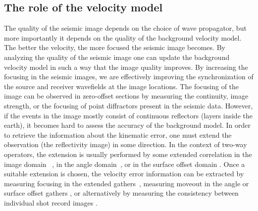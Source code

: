 \subsection{The role of the velocity model}
The quality of the seismic image depends on the choice of wave propagator, but more importantly
 it depends on the quality of the background velocity model. The better the velocity, the more
 focused the seismic image becomes. By analyzing the quality of the 
seismic image one can update the background velocity model in such a way that the image quality improves. 
 By increasing the focusing in the seismic images, we are effectively improving the synchronization
of the source and receiver wavefields at the image locations. 
 The focusing of the image can be observed in zero-offset sections by measuring the 
continuity, image strength, or the focusing of point diffractors present in the seismic data. 
 However, if the events in the image mostly consist of continuous reflectors (layers inside the earth),
it becomes hard to assess the accuracy of the background model. 
 In order to retrieve the information about the kinematic error, one must extend the 
observation (the reflectivity image) in some direction. In the context of two-way operators, 
the extension is usually performed by some extended correlation in the image domain
~\citep{rickett:883,sava:S209,GPR:GPR888}, in the angle domain~\citep{sava:1065,yoon,Jin,yoon2,Vyas}, or 
 in the surface offset domain \citep{giboli}. 
 Once a suitable extension is chosen, the velocity error information can be extracted by measuring 
focusing in the extended gathers~\citep{ShenSymes.geo.2008,Wiktor,tony_seg:cwp12,Shan:chevron,BiondiAli:2014,diaz2015,tony:gp15},
 measuring moveout in the angle or surface offset gathers \citep{Liu2010,yiShen,Fleury}, or alternatively
by measuring the consistency between individual shot record images \citep{perrone2015waveform}.

